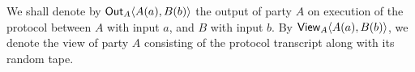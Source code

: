 
We shall denote by $\mathsf{Out}_A\langle A(a), B(b)\rangle$ the output of party $A$ on execution of the protocol between $A$ with input $a$, and $B$ with input $b$. By $\mathsf{View}_A\langle A(a), B(b)\rangle$, we denote the view of party $A$ consisting of the protocol transcript along with its random tape.